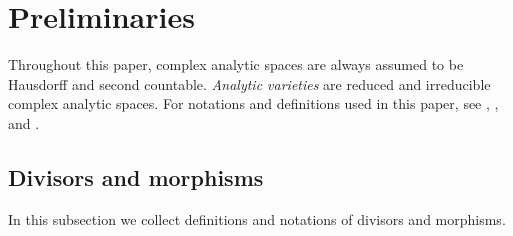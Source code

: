 \documentclass[12pt]{amsart}
\theoremstyle{definition}
\begin{document}
\section{Preliminaries}\label{sec--preliminaries}

Throughout this paper, complex analytic spaces are always assumed to be Hausdorff and second countable. 
{\em Analytic varieties} are reduced and irreducible complex analytic spaces. 
For notations and definitions used in this paper, see \cite{fujino-analytic-bchm}, \cite{eh-analytic-mmp}, and  \cite{eh-semistablereduction}. 

\subsection{Divisors and morphisms}
In this subsection we collect definitions and notations of divisors and morphisms. 
\end{document}
